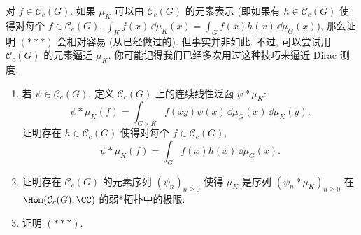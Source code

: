 \begin{enumerate}
\[\]
对 $f \in \mathcal{C}_c(G)$. 如果 $\mu_K$ 可以由 $\mathcal{C}_c(G)$ 的元素表示 (即如果有 $h \in \mathcal{C}_c(G)$ 使得对每个 $f \in \mathcal{C}_c(G)$, $\int_K f(x)\,\dd\mu_K(x) = \int_G f(x)h(x)\,\dd\mu_G(x)$), 那么证明 $(***)$ 会相对容易 (从已经做过的). 但事实并非如此. 不过, 可以尝试用 $\mathcal{C}_c(G)$ 的元素逼近 $\mu_K$. 你可能记得我们已经多次用过这种技巧来逼近 Dirac 测度.
\begin{enumerate}
\item[(a)] 若 $\psi \in \mathcal{C}_c(G)$, 定义 $\mathcal{C}_c(G)$ 上的连续线性泛函 $\psi * \mu_K$:
\[
\psi * \mu_K(f) = \int_{G \times K}f(xy)\psi(x)\,\dd\mu_G(x)\,\dd\mu_K(y).
\]
证明存在 $h \in \mathcal{C}_c(G)$ 使得对每个 $f \in \mathcal{C}_c(G)$,
\[
\psi * \mu_K(f) = \int_G f(x)h(x)\,\dd\mu_G(x).
\]
\item[(b)] 证明存在 $\mathcal{C}_c(G)$ 的元素序列 $(\psi_n)_{n \geq 0}$ 使得 $\mu_K$ 是序列 $(\psi_n * \mu_K)_{n \geq 0}$ 在 $\Hom(\mathcal{C}_c(G), \CC)$ 的弱*拓扑中的极限.
\item[(c)] 证明 $(***)$.
\end{enumerate}
\end{enumerate}


